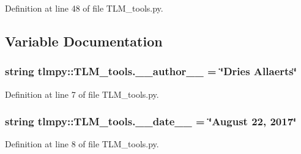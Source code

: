 Definition at line 48 of file TLM\_\-tools.py.

\subsection{Variable Documentation}
\hypertarget{namespacetlmpy_1_1TLM__tools_a9cd290fffdeffb1cd06bae52ade4ebf6}{
\subsubsection[{\_\-\_\-author\_\-\_\-}]{\setlength{\rightskip}{0pt plus 5cm}string {\bf tlmpy::TLM\_\-tools.\_\-\_\-author\_\-\_\-} = \char`\"{}Dries Allaerts\char`\"{}}}
\label{namespacetlmpy_1_1TLM__tools_a9cd290fffdeffb1cd06bae52ade4ebf6}


Definition at line 7 of file TLM\_\-tools.py.\hypertarget{namespacetlmpy_1_1TLM__tools_a2677c6d2f0ef70cc29273614a48cff98}{
\subsubsection[{\_\-\_\-date\_\-\_\-}]{\setlength{\rightskip}{0pt plus 5cm}string {\bf tlmpy::TLM\_\-tools.\_\-\_\-date\_\-\_\-} = \char`\"{}August 22, 2017\char`\"{}}}
\label{namespacetlmpy_1_1TLM__tools_a2677c6d2f0ef70cc29273614a48cff98}


Definition at line 8 of file TLM\_\-tools.py.